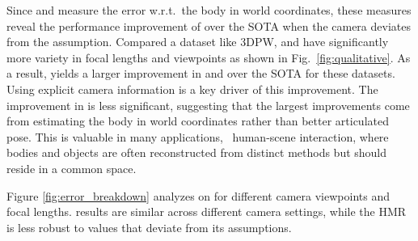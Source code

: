 \documentclass[10pt,twocolumn,letterpaper,usenames,dvipsnames]{article}
\begin{document}
Since \wmpjpe and \wpve measure the error w.r.t.~the body in world coordinates, 
these measures reveal the performance improvement of \methodname over the SOTA when the camera deviates from the \iwcam assumption. 
Compared a dataset like 3DPW, \mtpcam and \agoracam have significantly more variety in focal lengths and viewpoints as shown in Fig.~\ref{fig:qualitative}.
As a result, \methodname yields a larger improvement in \wmpjpe and \wpve  over the SOTA for these datasets.
Using explicit camera information is a key driver of this improvement. 
The improvement in \pampjpe is less significant, suggesting that the largest improvements come from estimating the body in world coordinates rather than better articulated pose.
This is valuable in many applications, \eg~human-scene interaction, where bodies and objects are often reconstructed from distinct methods but should reside in a common space.

Figure \ref{fig:error_breakdown} analyzes \wmpjpe on \agoracam for different camera viewpoints and focal lengths. \methodname results are similar across different camera settings, while the HMR is less robust to values that deviate from its assumptions.
\end{document}
